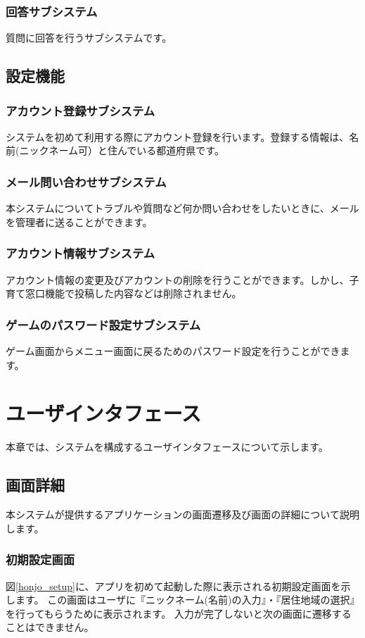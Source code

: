 \documentclass[a4j]{jarticle}
\begin{document}
\subsubsection*{回答サブシステム}
質問に回答を行うサブシステムです。

\subsection{設定機能}
\subsubsection*{アカウント登録サブシステム}
システムを初めて利用する際にアカウント登録を行います。登録する情報は、名前(ニックネーム可）と住んでいる都道府県です。
\subsubsection*{メール問い合わせサブシステム}
本システムについてトラブルや質問など何か問い合わせをしたいときに、メールを管理者に送ることができます。
\subsubsection*{アカウント情報サブシステム}
アカウント情報の変更及びアカウントの削除を行うことができます。しかし、子育て窓口機能で投稿した内容などは削除されません。
\subsubsection*{ゲームのパスワード設定サブシステム}
ゲーム画面からメニュー画面に戻るためのパスワード設定を行うことができます。

\newpage
\section{ユーザインタフェース}
本章では、システムを構成するユーザインタフェースについて示します。

\subsection{画面詳細}
本システムが提供するアプリケーションの画面遷移及び画面の詳細について説明します。
\subsubsection{初期設定画面}
図\ref{honjo_setup}に、アプリを初めて起動した際に表示される初期設定画面を示します。
この画面はユーザに『ニックネーム(名前)の入力』・『居住地域の選択』を行ってもらうために表示されます。
入力が完了しないと次の画面に遷移することはできません。
\end{document}
